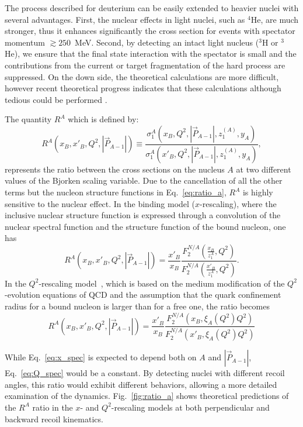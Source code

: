 The process described for deuterium can be easily extended to heavier nuclei with several advantages. First, the nuclear effects in light nuclei, such as $^4$He, are much stronger, thus it enhances significantly the cross section for events with spectator momentum $\gtrsim 250$~MeV. Second, by detecting an intact light nucleus ($^3$H or $^3$He), we ensure that the final state interaction with the spectator is small and the contributions from the current or target fragmentation of the hard process are suppressed. On the down side, the theoretical calculations are more difficult, however recent theoretical progress indicates that these calculations although tedious could be performed \cite{CiofidegliAtti:1993ep,CiofidegliAtti2003,Alvioli:2006jd,Palli2009}. 

The quantity $R^A$ which is defined by:
\begin{equation}
R^A(x_B,x'_B,Q^2,|\vec P_{A-1}|) \equiv \frac{\sigma_1^A(x_B,Q^2,|\vec P_{A-1}|,z_1^{(A)},y_A)}{\sigma_1^A(x'_B,Q^2,|\vec P_{A-1}|,z_1^{(A)},y_A)},
\label{eq:ratio_a}
\end{equation}
represents the ratio between the cross sections on the nucleus $A$ at two different values of the Bjorken scaling variable. Due to the cancellation of all the other terms but the nucleon structure functions in Eq.~\ref{eq:ratio_a}, $R^A$ is highly sensitive to the nuclear effect. In the binding model ($x$-rescaling), where the inclusive nuclear structure function is expressed through a convolution of the nuclear spectral function and the structure function of the bound nucleon, one has
\begin{equation}
R^A(x_B,x'_B,Q^2,|\vec P_{A-1}|) = \frac{x'_B}{x_B}\frac{F_2^{N/A}(\frac{x_B}{z_1^A},Q^2)}{F_2^{N/A}(\frac{x'_B}{z_1^A},Q^2)}.
\label{eq:x_spec}
\end{equation}
In the $Q^2$-rescaling model~\cite{Close1988}, which is based on the medium modification of the $Q^2$-evolution equations of QCD and the assumption that the quark confinement radius for a bound nucleon is larger than for a free one, the ratio becomes
\begin{equation}
R^A(x_B,x'_B,Q^2,|\vec P_{A-1}|) = \frac{x'_B}{x_B}\frac{F_2^{N/A}(x_B,\xi_A(Q^2)Q^2)}{F_2^{N/A}(x'_B,\xi_A(Q^2)Q^2)}
\label{eq:Q_spec}
\end{equation}

While Eq.~\ref{eq:x_spec} is expected to depend both on $A$ and $|\vec P_{A-1}|$, Eq.~\ref{eq:Q_spec} would be a constant. By detecting nuclei with different recoil angles, this ratio would exhibit different behaviors, allowing a more detailed examination of the dynamics. Fig.~\ref{fig:ratio_a} shows theoretical predictions of the $R^A$ ratio in the $x$- and $Q^2$-rescaling models at both perpendicular and backward recoil kinematics.

